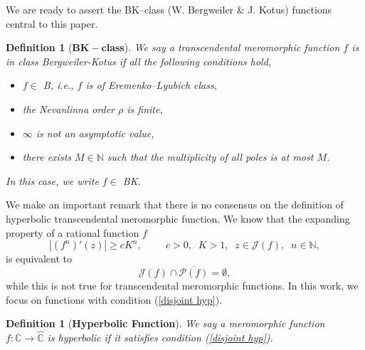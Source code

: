 \documentclass[12pt,reqno]{amsart}
\newtheorem{definition}[theorem]{Definition}
\begin{document}
\noindent We are ready to assert the BK--class (W. Bergweiler \& J. Kotus) functions central to this paper. 
\begin{definition}[\textbf{$\mathbf{BK}-$class}]\label{BK}
    We say a transcendental meromorphic function $f$ is in class Bergweiler-Kotus if all the following conditions hold,
    \begin{itemize}
        \item[i)] $f \in$ B, i.e., $f$ is of Eremenko–Lyubich class,
        \item[ii)] the Nevanlinna order $\rho$ is finite,
        \item[iii)] $\infty$ is not an asymptotic value,
        \item[iv)] there exists $M \in \mathbb{N}$ such that the multiplicity of all poles is at most $M$.
    \end{itemize}
    In this case, we write $f\in $ BK.
\end{definition}
\noindent We make an important remark that there is no consensus on the definition of hyperbolic transcendental meromorphic function. We know that the expanding property of a rational function $f$
\begin{equation}
    |(f^n)'(z)|\geq c K^n, \hspace{1cm} c>0, \;\; K>1, \; \; z \in \mathcal{J}(f), \; \; n \in \mathbb{N},
\end{equation}
is equivalent to 
\begin{equation}\label{disjoint hyp}
  \mathcal{J}(f)\cap \overline{\mathcal{P}(f)}=\emptyset,  
\end{equation}
while this is not true for transcendental meromorphic functions. In this work, we focus on functions with condition (\ref{disjoint hyp}).
\begin{definition}[\textbf{Hyperbolic Function}]\label{toplogically hyp}
    We say a meromorphic function $f: \mathbb{C} \to \hat{\mathbb{C}}$ is hyperbolic if it satisfies condition (\ref{disjoint hyp}).
\end{definition}
\end{document}
